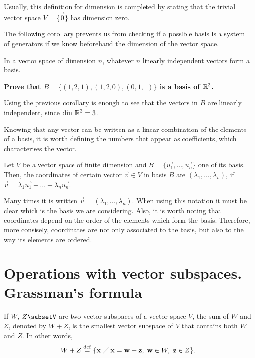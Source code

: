 \begin{note}
    Usually, this definition for dimension is completed by stating that the trivial vector space $V = \{\vec{0}\} $ has dimension zero.
\end{note}

The following corollary prevents us from checking if a possible basis is a system of generators if we know
beforehand the dimension of the vector space.

\begin{coro}
    In a vector space of dimension $n$, whatever $n$ linearly independent vectors form a basis.
\end{coro}

\begin{example}
    \textbf{Prove that $B = \{\left( 1, 2, 1 \right) , \left( 1, 2, 0 \right), \left( 0, 1, 1 \right)\} $ is
    a basis of $\mathbb{R}^3$.}

    Using the previous corollary is enough to see that the vectors in $B$ are linearly independent, since 
    $\dim \mathbb{R}^3 = 3$.
\end{example}

Knowing that any vector can be written as a linear combination of the elements of a basis, it is worth 
defining the numbers that appear as coefficients, which characterises the vector.

\begin{defi}[Coordinates]
    Let $V$ be a vector space of finite dimension and $B = \{\vec{u_1}, \ldots, \vec{u_n}\} $ one of its
    basis. Then, the coordinates of certain vector $\vec{v}\in V$ in basis $B$ are $\left( \lambda_1, \ldots,
    \lambda_n\right) $, if $\vec{v} = \lambda_1\vec{u_1} + \ldots + \lambda_n\vec{u_n}$.
\end{defi}

\begin{note}
    Many times it is written $\vec{v} = \left( \lambda_1, \ldots, \lambda_n \right) $. When using this
    notation it must be clear which is the basis we are considering. Also, it is worth noting that coordinates
    depend on the order of the elements which form the basis. Therefore, more consisely, coordinates are not
    only associated to the basis, but also to the way its elements are ordered.
\end{note}

\section{Operations with vector subspaces. Grassman's formula}
\begin{prop}
    If $W$, $Z\subsetV$ are two vector subspaces of a vector space $V$, the sum of $W$ and $Z$, denoted by
    $W + Z$, is the smallest vector subspace of $V$ that contains both $W$ and $Z$. In other words,
    \begin{equation}
        W + Z \overset{\mathrm{def}}{=} \{\mathbf{x}\;\diagup\; \mathbf{x} = \mathbf{w} + \mathbf{z},\ \mathbf{w}\in W,\ \mathbf{z}\in Z\}. 
    \end{equation}
\end{prop}

